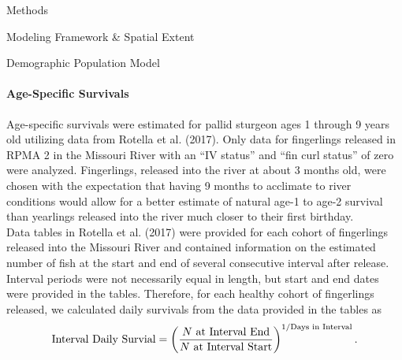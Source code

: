 \documentclass[12pt]{article}
\begin{document}
\begin{section}{Methods}
\begin{subsection}{Modeling Framework \& Spatial Extent}
\begin{subsubsection}{Demographic Population Model}
\paragraph{Age-Specific Survivals}
Age-specific survivals were estimated for pallid sturgeon ages 1 through 9 years old utilizing data from Rotella et al. (2017).  Only data for fingerlings released in RPMA 2 in the Missouri River with an ``IV status'' and ``fin curl status'' of zero were analyzed.  Fingerlings, released into the river at about 3 months old, were chosen with the expectation that having 9 months to acclimate to river conditions would allow for a better estimate of natural age-1 to age-2 survival than yearlings released into the river much closer to their first birthday.\\  

Data tables in Rotella et al. (2017) were provided for each cohort of fingerlings released into the Missouri River and contained information on the estimated number of fish at the start and end of several consecutive interval after release.  Interval periods were not necessarily equal in length, but start and end dates were provided in the tables.  Therefore, for each healthy cohort of fingerlings released, we calculated daily survivals from the data provided in the tables as
\begin{equation}
\mbox{Interval Daily Survial}=\left(\frac{N \mbox{ at Interval End}}{N \mbox{ at Interval Start}}\right)^{1/\mbox{{\scriptsize Days in Interval}}}.
\end{equation}


\end{subsubsection}
\end{subsection}
\end{section}
\end{document}
